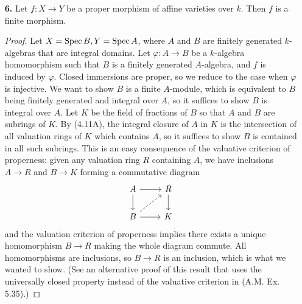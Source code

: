 \documentclass[a4paper]{article}
\begin{document}
\begin{enumerate} [label=\textbf{\arabic*.}, leftmargin=0em]
\begin{proof}
    \begin{itemize} [leftmargin=0cm]
        \item[(a)] Let $k$ be a field, let $X = \spec{k[\varepsilon]/(\varepsilon^2)}$ (Ex. 2.8), and let $Y$ be any scheme over $k$. Giving a $k$-morphism $X \to Y$ is equivalent to giving a point in $y \in Y$ rational over $k$, and an element of $\goth{m}_y / \goth{m}_y^2$.
        \item[(b)] Let $X$ be the affine line, and let $Y$ be the affine line with the origin doubled. We have two possible open immersions of $X$ into $Y$ with each one having either origin in its image, and the open immersions agree on the complement of the origin of $X$, which is an open dense subset of $X$.
    \end{itemize}
\end{proof}

\item[\textbf{6.}] Let $f : X \to Y$ be a proper morphism of affine varieties over $k$. Then $f$ is a finite morphism.

\begin{proof}
    Let $X = \operatorname{Spec}{B}, Y = \operatorname{Spec}{A}$, where $A$ and $B$ are finitely generated $k$-algebras that are integral domains. Let $\varphi : A \to B$ be a $k$-algebra homomorphism such that $B$ is a finitely generated $A$-algebra, and $f$ is induced by $\varphi$. Closed immersions are proper, so we reduce to the case when $\varphi$ is injective. We want to show $B$ is a finite $A$-module, which is equivalent to $B$ being finitely generated and integral over $A$, so it suffices to show $B$ is integral over $A$. Let $K$ be the field of fractions of $B$ so that $A$ and $B$ are subrings of $K$. By (4.11A), the integral closure of $A$ in $K$ is the intersection of all valuation rings of $K$ which contains $A$, so it suffices to show $B$ is contained in all such subrings. This is an easy consequence of the valuative criterion of properness: given any valuation ring $R$ containing $A$, we have inclusions $A \to R$ and $B \to K$ forming a commutative diagram
    \[\begin{tikzcd}
        A \arrow[d] \arrow[r]          & R \arrow[d] \\
        B \arrow[r] \arrow[ru, dashed] & K          
        \end{tikzcd} \]
    and the valuation criterion of properness implies there exists a unique homomorphism $B \to R$ making the whole diagram commute. All homomorphisms are inclusions, so $B \to R$ is an inclusion, which is what we wanted to show. (See an alternative proof of this result that uses the universally closed property instead of the valuative criterion in (A.M. Ex. 5.35).)
\end{proof}


\end{enumerate}
\end{document}

